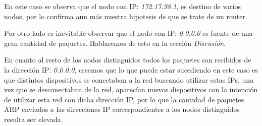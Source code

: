 En este caso se observa que el nodo con IP: \textit{172.17.98.1}, es destino de varios nodos, por lo confirma aun más nuestra hipotesis de que se trate de un router.

Por otro lado es inevitable observar que el nodo con IP: \textit{0.0.0.0} es fuente de una gran cantidad de paquetes. Hablaremos de esto en la sección \textit{Discusión}. 

En cuanto al resto de los nodos distinguidos todos los paquetes son recibidos de la dirección IP: \textit{0.0.0.0}, creemos que lo que puede estar sucediendo en este caso es que distintos dispositivos se conectaban a la red buscando utilizar estas IPs, una vez que se desconectaban de la red, aparecían nuevos dispositivos con la intención de utilizar esta red con dicha dirección IP, por lo que la cantidad de paquetes ARP enviados a las direcciones IP correspondientes a los nodos distinguidos resulta ser elevada.
